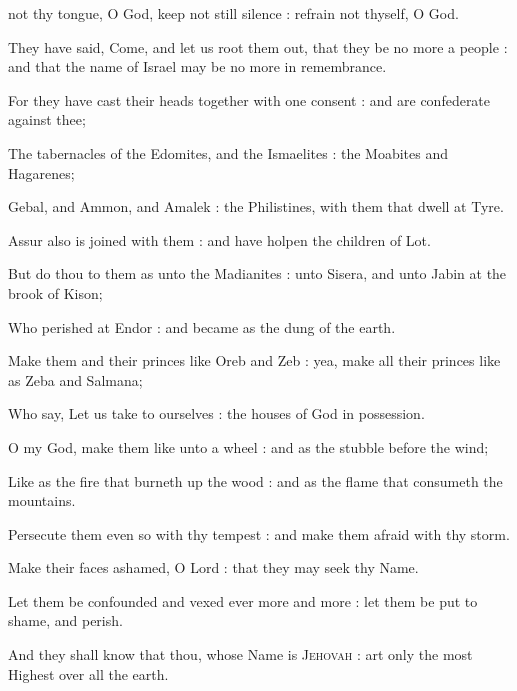  not thy tongue, O God, keep not still silence : refrain not thyself, O God.\par
{}
They have said, Come, and let us root them out, that they be no more a people : and that the name of Israel may be no more in remembrance.\par
{}For they have cast their heads together with one consent : and are confederate against thee;\par
{}The tabernacles of the Edomites, and the Ismaelites : the Moabites and Hagarenes;\par
{}Gebal, and Ammon, and Amalek : the Philistines, with them that dwell at Tyre.\par
{}Assur also is joined with them : and have holpen the children of Lot.\par
{}But do thou to them as unto the Madianites : unto Sisera, and unto Jabin at the brook of Kison;\par
{}Who perished at Endor : and became as the dung of the earth.\par
{}Make them and their princes like Oreb and Zeb : yea, make all their princes like as Zeba and Salmana;\par
{}Who say, Let us take to ourselves : the houses of God in possession.\par
{}O my God, make them like unto a wheel : and as the stubble before the wind;\par
{}Like as the fire that burneth up the wood : and as the flame that consumeth the mountains.\par
{}Persecute them even so with thy tempest : and make them afraid with thy storm.\par
{}Make their faces ashamed, O Lord : that they may seek thy Name.\par
{}Let them be confounded and vexed ever more and more : let them be put to shame, and perish.\par
{}And they shall know that thou, whose Name is \textsc{Jehovah} : art only the most Highest over all the earth.\par


